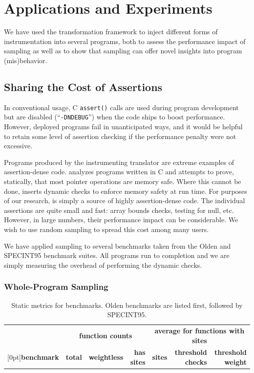 \section{Applications and Experiments}
\label{sec:applications}

We have used the transformation framework to inject different forms of
instrumentation into several programs, both to assess the performance
impact of sampling as well as to show that sampling can offer novel
insights into program (mis)behavior.

\subsection{Sharing the Cost of Assertions}
\label{sec:ccured}

In conventional usage, C \texttt{assert()} calls are used during
program development but are disabled (``\texttt{-DNDEBUG}'') when the
code ships to boost performance.  However, deployed programs fail in
unanticipated ways, and it would be helpful to retain some level of
assertion checking if the performance penalty were not excessive.

Programs produced by the \CCured instrumenting translator
\cite{POPL_'02*128} are extreme examples of assertion-dense code.
\CCured analyzes programs written in C and attempts to prove,
statically, that most pointer operations are memory safe.  Where this
cannot be done, \CCured inserts dynamic checks to enforce memory
safety at run time.  For purposes of our research, \CCured is simply a
source of highly assertion-dense code.  The individual assertions are
quite small and fast: array bounds checks, testing for null, etc.
However, in large numbers, their performance impact can be
considerable.  We wish to use random sampling to spread this cost
among many users.

We have applied sampling to several benchmarks taken from the Olden
\cite{Carlisle:1996:OPPWDDSDMM} and SPECINT95 \cite{SPEC95} benchmark
suites.  All programs run to completion and we are simply measuring
the overhead of performing the dynamic checks.

\subsubsection{Whole-Program Sampling}
\label{sec:share:whole}

\begin{table}[tb]
  \centering
  \small
  \begin{tabular}{|l|rrr|rrr|}
    \hline
    & \multicolumn{3}{c|}{\textbf{function counts}} & \multicolumn{3}{c|}{\textbf{average for functions with sites}} \\
    \raisebox{1.5ex}[0pt]{\textbf{benchmark}} & \textbf{total} & \textbf{weightless} & \textbf{has sites} & \textbf{sites} & \textbf{threshold checks} & \textbf{threshold weight} \\
    \hline\hline
    
  \end{tabular}
  \caption{Static metrics for \CCured benchmarks.  Olden benchmarks
    are listed first, followed by SPECINT95.}
  \label{tab:share:static}
\end{table}

